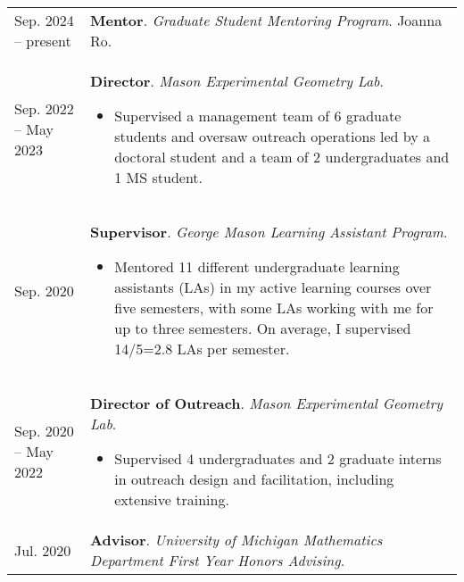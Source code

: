     \begin{center}
    {
    \renewcommand{\arraystretch}{1.5}
    \begin{longtable}{p{}  p{}}
     Sep.  2024 --    present & \textbf{Mentor}. \textit{Graduate Student Mentoring Program}.  Joanna Ro.  \\ 
 Sep.  2022 --  May  2023 & \textbf{Director}. \textit{Mason Experimental Geometry Lab}. 
        \hspace{-1em}

        {\small
        \begin{itemize}
        \setlength{\parindent}{0em}
        \item[] Supervised a management team of 6 graduate students and oversaw outreach operations led by a doctoral student and a team of 2 undergraduates and 1 MS student.
        \end{itemize}
        }
        \vspace{-1em}
         \\ 
 Sep.  2020 & \textbf{Supervisor}. \textit{George Mason Learning Assistant Program}. 
        \hspace{-1em}

        {\small
        \begin{itemize}
        \setlength{\parindent}{0em}
        \item[] Mentored 11 different undergraduate learning assistants (LAs) in my active learning courses over five semesters, with some LAs working with me for up to three semesters. On average, I supervised 14/5=2.8 LAs per semester.
        \end{itemize}
        }
        \vspace{-1em}
         \\ 
 Sep.  2020 --  May  2022 & \textbf{Director of Outreach}. \textit{Mason Experimental Geometry Lab}. 
        \hspace{-1em}

        {\small
        \begin{itemize}
        \setlength{\parindent}{0em}
        \item[] Supervised 4 undergraduates and 2 graduate interns in outreach design and facilitation, including extensive training.
        \end{itemize}
        }
        \vspace{-1em}
         \\ 
 Jul.  2020 & \textbf{Advisor}. \textit{University of Michigan Mathematics Department First Year Honors Advising}.  
    \end{longtable}
    } 
    \end{center}

    \vspace{-1em}
    